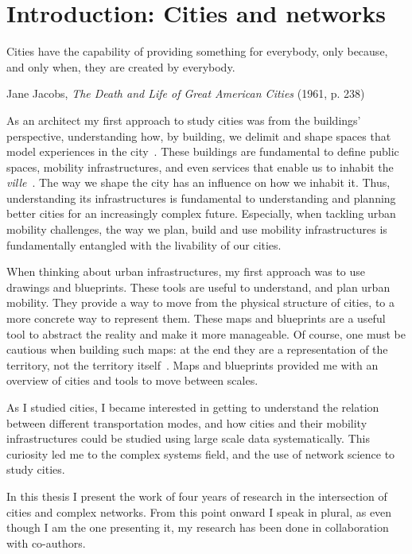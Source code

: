 \chapter{Introduction: Cities and networks}

\epigraph{Cities have the capability of providing something for everybody, only because, and only when, they are created by everybody.}{Jane Jacobs, \textit{The Death and Life of Great American Cities} (1961, p. 238)}

As an architect my first approach to study cities was from the buildings' perspective, understanding how, by building, we delimit and shape spaces that model experiences in the city~\cite{gehl1971life}. These buildings are fundamental to define public spaces, mobility infrastructures, and even services that enable us to inhabit the \textit{ville}~\cite{sennett2018building}. The way we shape the city has an influence on how we inhabit it. Thus, understanding its infrastructures is fundamental to understanding and planning better cities for an increasingly complex future. Especially, when tackling urban mobility challenges, the way we plan, build and use mobility infrastructures is fundamentally entangled with the livability of our cities.

When thinking about urban infrastructures, my first approach was to use drawings and blueprints. These tools are useful to understand, and plan urban mobility. They provide a way to move from the physical structure of cities, to a more concrete way to represent them. These maps and blueprints are a useful tool to abstract the reality and make it more manageable. Of course, one must be cautious when building such maps: at the end they are a representation of the territory, not the territory itself~\cite{borges1961hacedor}. Maps and blueprints provided me with an overview of cities and tools to move between scales.

As I studied cities, I became interested in getting to understand the relation between different transportation modes, and how cities and their mobility infrastructures could be studied using large scale data systematically. This curiosity led me to the complex systems field, and the use of network science to study cities. 

In this thesis I present the work of four years of research in the intersection of cities and complex networks. From this point onward I speak in plural, as even though I am the one presenting it, my research has been done in collaboration with co-authors. 

